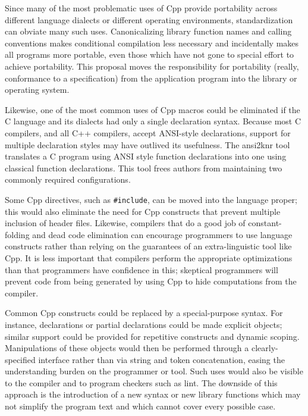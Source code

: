 \documentclass[10pt]{article}
\begin{document}
Since many of the most problematic uses of Cpp provide portability across
different language dialects or different operating environments,
standardization can obviate many such uses.  Canonicalizing library
function names and calling conventions makes conditional compilation less
necessary and incidentally makes all programs more portable, even those
which have not gone to special effort to achieve portability.  This
proposal moves the responsibility for portability (really, conformance to a
specification) from the application program into the library or operating
system.  

Likewise, one of the most common uses of Cpp macros could be eliminated if
the C language and its dialects had only a single declaration syntax.
Because most C compilers, and all C++ compilers, accept ANSI-style
declarations, support for multiple declaration styles may have outlived its
usefulness.  The ansi2knr tool~\cite{Deutsch90} translates a C program
using ANSI style function declarations into one using classical function
declarations.  This tool frees authors from maintaining two commonly
required configurations.

Some Cpp directives, such as {\tt \#include}, can be moved into the
language proper; this would also eliminate the need for Cpp constructs that
prevent multiple inclusion of header files.  Likewise, compilers that do a
good job of constant-folding and dead code elimination can encourage
programmers to use language constructs rather than relying on the
guarantees of an extra-linguistic tool like Cpp.  It is less important that
compilers perform the appropriate optimizations than that programmers have
confidence in this; skeptical programmers will prevent code from being
generated by using Cpp to hide computations from the compiler.

Common Cpp constructs could be replaced by a special-purpose syntax.  For
instance, declarations or partial declarations could be made explicit
objects; similar support could be provided for repetitive constructs and
dynamic scoping.  Manipulations of these objects would then be performed
through a clearly-specified interface rather than via string and token
concatenation, easing the understanding burden on the programmer or tool.
Such uses would also be visible to the compiler and to program checkers
such as lint.  The downside of this approach is the introduction of a new
syntax or new library functions which may not simplify the program text and
which cannot cover every possible case.
\end{document}
